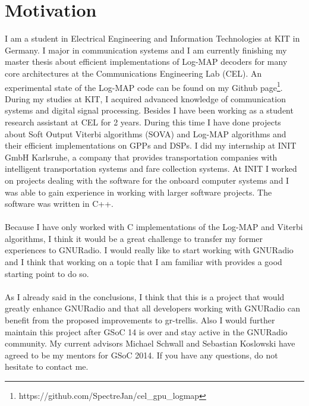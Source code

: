 \documentclass[11pt,		%
	    DIV12,		%
	    a4paper,		%
	    final,		%
	    halfparskip,	%
	    ]{scrartcl}		%
\begin{document}
\section{Motivation}
I am a student in Electrical Engineering and Information Technologies at KIT in Germany. I major in communication systems and I am currently finishing my master thesis about efficient implementations of Log-MAP decoders for many core architectures at the Communications Engineering Lab (CEL). An experimental state of the Log-MAP code can be found on my Github page\footnote[1]{https://github.com/SpectreJan/cel\_gpu\_logmap}. During my studies at KIT, I acquired advanced knowledge of communication systems and digital signal processing. Besides I have been working as a student research assistant at CEL for 2 years. During this time I have done projects about Soft Output Viterbi algorithms (SOVA) and Log-MAP algorithms and their efficient implementations on GPPs and DSPs. I did my internship at INIT GmbH Karlsruhe, a company that provides transportation companies with intelligent transportation systems and fare collection systems. At INIT I worked on projects dealing with the software for the onboard computer systems and I was able to gain experience in working with larger software projects. The software was written in C++.\\ \\Because I have only worked with C implementations of the Log-MAP and Viterbi algorithms, I think it would be a great challenge to transfer my former experiences to GNURadio. I would really like to start working with GNURadio and I think that working on a topic that I am familiar with provides a good starting point to do so.\\ \\As I already said in the conclusions, I think that this is a project that would greatly enhance GNURadio and that all developers working with GNURadio can benefit from the proposed improvements to gr-trellis. Also I would further maintain this project after GSoC 14 is over and stay active in the GNURadio community. My current advisors Michael Schwall and Sebastian Koslowski have agreed to be my mentors for GSoC 2014. If you have any questions, do not hesitate to contact me.\newpage                    
\appendix

%  
%  
%  
  
\end{document}
